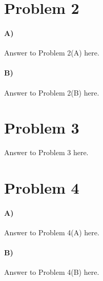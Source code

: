 \documentclass[10pt,letter]{article}
\begin{document}
\section*{Problem 2}

\paragraph{A)} Answer to Problem 2(A) here.

\paragraph{B)} Answer to Problem 2(B) here.


\section*{Problem 3} Answer to Problem 3 here.


\section*{Problem 4}

\paragraph{A)} Answer to Problem 4(A) here.

\paragraph{B)}  Answer to Problem 4(B) here.
\end{document}
